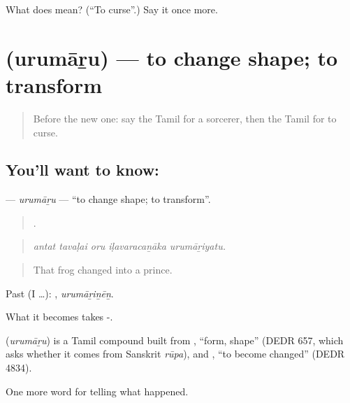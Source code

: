 \begin{tcolorbox}[breakable,colback=teal!4,colframe=teal!35!black,title={Before you move on}]
What does  mean? (\textquotedblleft{}To curse\textquotedblright{}.) Say it once more.
\end{tcolorbox}
\section[\texorpdfstring{\ta{உருமாறு} (urumāṟu)}{உருமாறு (urumāṟu)}]{ (urumāṟu) — to change shape; to transform}

\label{lesson:TA-C344-urumaru}



\begin{quote}
Before the new one: say the Tamil for a sorcerer, then the Tamil for to curse.
\end{quote}

\subsection*{You'll want to know: }
\textbf{} — \emph{urumāṟu} — \textquotedblleft{}to change shape; to transform\textquotedblright{}.

\begin{quote}
    .
\end{quote}

\begin{quote}
\emph{antat tavaḷai oru iḷavaracaṉāka urumāṟiyatu.}
\end{quote}

\begin{quote}
That frog changed into a prince.
\end{quote}

Past (I …): , \emph{urumāṟiṉēṉ}.

What it becomes takes -.

\begin{cousinweb}
\textbf{} (\emph{urumāṟu}) is a Tamil compound built from , \textquotedblleft{}form, shape\textquotedblright{} (DEDR 657, which asks whether it comes from Sanskrit \emph{rūpa}), and , \textquotedblleft{}to become changed\textquotedblright{} (DEDR 4834).
\end{cousinweb}

\begin{grammarlens}[title={What you've built}]
One more word for telling what happened.
\end{grammarlens}

